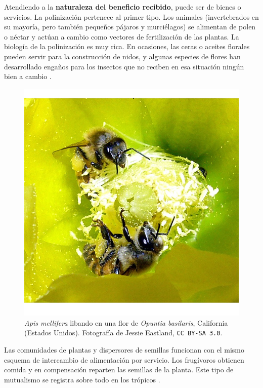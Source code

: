 Atendiendo a la \textbf{naturaleza del beneficio recibido}, puede ser de bienes o servicios. La polinización pertenece al primer tipo. Los animales (invertebrados en su mayoría, pero también pequeños pájaros y murciélagos) se alimentan de polen o néctar y actúan a cambio como vectores de fertilización de las plantas. La biología de la polinización es muy rica. En ocasiones, las ceras o aceites florales pueden servir para la construcción de nidos, y algunas especies de flores han desarrollado engaños para los insectos que no reciben en esa situación ningún bien a cambio \cite{rech2014biologia}.

\begin{figure}[h!]
\centering
\includegraphics[scale=0.33]{Figures/INTRO_Pollination.jpg}
\caption{\textit{Apis mellifera} libando en una flor de \textit{Opuntia basilaris}, California (Estados Unidos). Fotografía de Jessie Eastland, \small{\texttt{CC BY-SA 3.0}}.}
\label{fig:INTRO_Pollination}
\end{figure}

Las comunidades de plantas y dispersores de semillas funcionan con el mismo esquema de intercambio de alimentación por servicio. Los frugívoros obtienen comida y en compensación reparten las semillas de la planta. Este tipo de mutualismo se registra sobre todo en los trópicos \cite{bascompte2007plant, estrada2012frugivores}.
	
